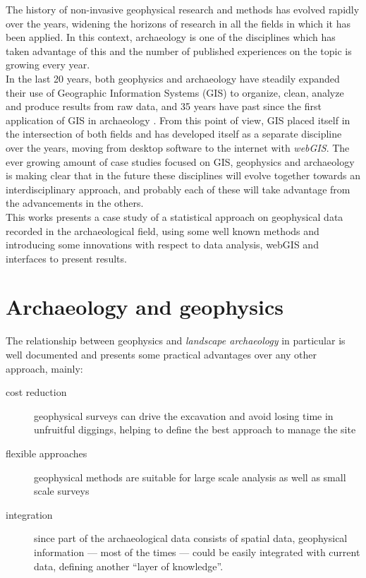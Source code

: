     The history of non-invasive geophysical research and methods has evolved rapidly over the years, widening the horizons of research in all the fields in which it has been applied. In this context, archaeology is one of the disciplines which has taken advantage of this and the number of published experiences on the topic is growing every year.\\
    In the last 20 years, both geophysics and archaeology have steadily expanded their use of Geographic Information Systems (GIS) to organize, clean, analyze and produce results from raw data, and 35 years have past since the first application of GIS in archaeology \cite[pp.~2--3]{kvamme1995}. From this point of view, GIS placed itself in the intersection of both fields and has developed itself as a separate discipline over the years, moving from desktop software to the internet with \emph{webGIS}. The ever growing amount of case studies focused on GIS, geophysics and archaeology is making clear that in the future these disciplines will evolve together towards an interdisciplinary approach, and probably each of these will take advantage from the advancements in the others.\\
    This works presents a case study of a statistical approach on geophysical data recorded in the archaeological field, using some well known methods and introducing some innovations with respect to data analysis, webGIS and interfaces to present results. 

    \section{Archaeology and geophysics}
    \label{sec:arch-geoph}
        The relationship between geophysics and \emph{landscape archaeology} in particular is well documented and presents some practical advantages over any other approach, mainly:
        \begin{description}
            \item[cost reduction] geophysical surveys can drive the excavation and avoid losing time in unfruitful diggings, helping to define the best approach to manage the site
            \item[flexible approaches] geophysical methods are suitable for large scale analysis as well as small scale surveys
            \item[integration] since part of the archaeological data consists of spatial data, geophysical information --- most of the times --- could be easily integrated with current data, defining another ``layer of knowledge''.
        \end{description}

